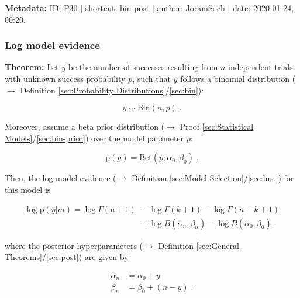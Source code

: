\documentclass[a4paper,12pt,twoside]{book}
\begin{document}
\vspace{1em}
\textbf{Metadata:} ID: P30 | shortcut: bin-post | author: JoramSoch | date: 2020-01-24, 00:20.
\vspace{1em}



\subsubsection[\textbf{Log model evidence}]{Log model evidence} \label{sec:bin-lme}
\setcounter{equation}{0}

\textbf{Theorem:} Let $y$ be the number of successes resulting from $n$ independent trials with unknown success probability $p$, such that $y$ follows a binomial distribution ($\rightarrow$ Definition \ref{sec:Probability Distributions}/\ref{sec:bin}):

\begin{equation} \label{eq:bin-lme-Bin}
y \sim \mathrm{Bin}(n,p) \; .
\end{equation}

Moreover, assume a beta prior distribution ($\rightarrow$ Proof \ref{sec:Statistical Models}/\ref{sec:bin-prior}) over the model parameter $p$:

\begin{equation} \label{eq:bin-lme-Bin-prior}
\mathrm{p}(p) = \mathrm{Bet}(p; \alpha_0, \beta_0) \; .
\end{equation}

Then, the log model evidence ($\rightarrow$ Definition \ref{sec:Model Selection}/\ref{sec:lme}) for this model is

\begin{equation} \label{eq:bin-lme-Bin-LME}
\begin{split}
\log \mathrm{p}(y|m) = \log \Gamma(n+1) &- \log \Gamma(k+1) - \log \Gamma(n-k+1) \\
&+ \log B(\alpha_n,\beta_n) - \log B(\alpha_0,\beta_0) \; .
\end{split}
\end{equation}

where the posterior hyperparameters ($\rightarrow$ Definition \ref{sec:General Theorems}/\ref{sec:post}) are given by

\begin{equation} \label{eq:bin-lme-Bin-post-par}
\begin{split}
\alpha_n &= \alpha_0 + y \\
\beta_n &= \beta_0 + (n-y) \; .
\end{split}
\end{equation}
\end{document}
